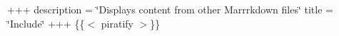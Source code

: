 +++ description = \char`\"{}\+Displays content from other Marrrkdown files\char`\"{} title = \char`\"{}\+Include\char`\"{} +++ \{\{$<$ piratify $>$\}\} 